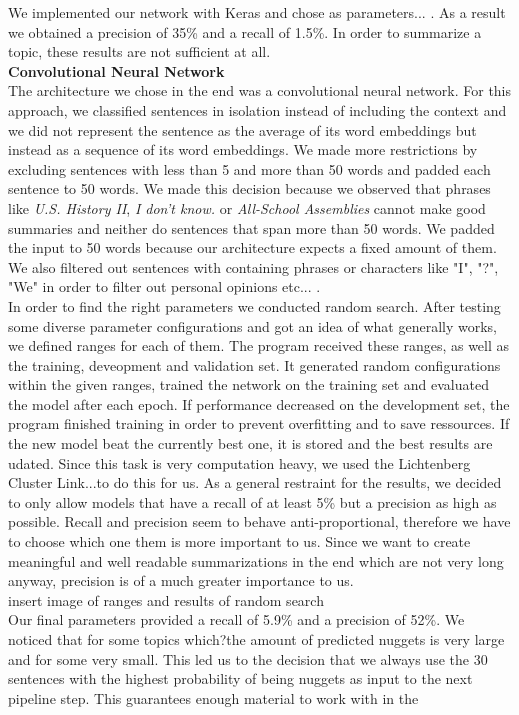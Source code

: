 We implemented our network with Keras and chose as parameters... . As a result we obtained a precision of 35\% and a recall of 1.5\%. In order to summarize a topic, these results are not sufficient at all.\\
\textbf{Convolutional Neural Network}\\
The architecture we chose in the end was a convolutional neural network. For this approach, we classified sentences in isolation instead of including the context and we did not represent the sentence as the average of its word embeddings but instead as a sequence of its word embeddings. We made more restrictions by excluding sentences with less than 5 and more than 50 words and padded each sentence to 50 words. We made this decision because we observed that phrases like \textit{U.S. History II}, \textit{I don't know.} or \textit{All-School Assemblies} cannot make good summaries and neither do sentences that span more than 50 words. We padded the input to 50 words because our architecture expects a fixed amount of them. We also filtered out sentences with containing phrases or characters like "I", "?", "We" in order to filter out personal opinions etc... .\\
In order to find the right parameters we conducted random search. After testing some diverse parameter configurations and got an idea of what generally works, we defined ranges for each of them. The program received these ranges, as well as the training, deveopment and validation set. It generated random configurations within the given ranges, trained the network on the training set and evaluated the model after each epoch. If performance decreased on the development set, the program finished training in order to prevent overfitting and to save ressources. If the new model beat the currently best one, it is stored and the best results are udated. Since this task is very computation heavy, we used the Lichtenberg Cluster \lbrack Link...\rbrack to do this for us. As a general restraint for the results, we decided to only allow models that have a recall of at least 5\% but a precision as high as possible. Recall and precision seem to behave anti-proportional, therefore we have to choose which one them is more important to us. Since we want to create meaningful and well readable summarizations in the end which are not very long anyway, precision is of a much greater importance to us. \\
\lbrack insert image of ranges and results of random search\rbrack \\
Our final parameters provided a recall of 5.9\% and a precision of 52\%. We noticed that for some topics \lbrack which?\rbrack the amount of predicted nuggets is very large and for some very small. This led us to the decision that we always use the 30 sentences with the highest probability of being nuggets as input to the next pipeline step. This guarantees enough material to work with in the 
